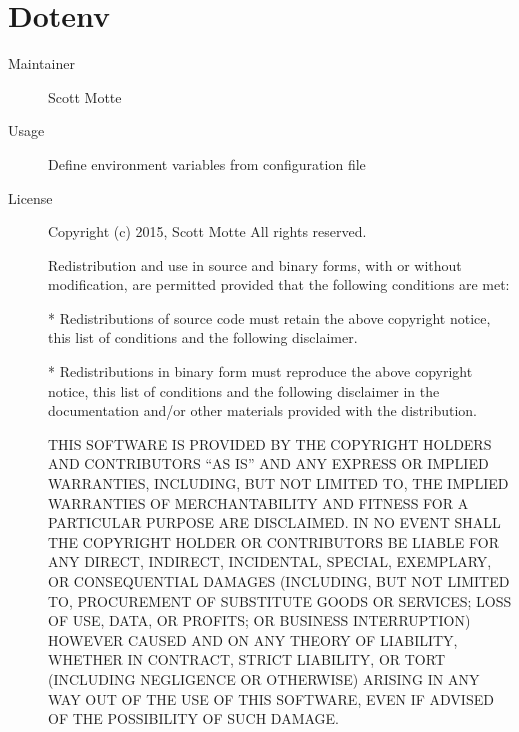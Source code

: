   \section*{Dotenv}
    \begin{description}
      \item[Maintainer] Scott Motte
      \item[Usage] Define environment variables from configuration file
      \item[License] \scriptsize Copyright (c) 2015, Scott Motte
        All rights reserved.

        Redistribution and use in source and binary forms, with or without
        modification, are permitted provided that the following conditions are met:

        * Redistributions of source code must retain the above copyright notice, this
          list of conditions and the following disclaimer.

        * Redistributions in binary form must reproduce the above copyright notice,
          this list of conditions and the following disclaimer in the documentation
          and/or other materials provided with the distribution.

        THIS SOFTWARE IS PROVIDED BY THE COPYRIGHT HOLDERS AND CONTRIBUTORS ``AS IS''
        AND ANY EXPRESS OR IMPLIED WARRANTIES, INCLUDING, BUT NOT LIMITED TO, THE
        IMPLIED WARRANTIES OF MERCHANTABILITY AND FITNESS FOR A PARTICULAR PURPOSE ARE
        DISCLAIMED. IN NO EVENT SHALL THE COPYRIGHT HOLDER OR CONTRIBUTORS BE LIABLE
        FOR ANY DIRECT, INDIRECT, INCIDENTAL, SPECIAL, EXEMPLARY, OR CONSEQUENTIAL
        DAMAGES (INCLUDING, BUT NOT LIMITED TO, PROCUREMENT OF SUBSTITUTE GOODS OR
        SERVICES; LOSS OF USE, DATA, OR PROFITS; OR BUSINESS INTERRUPTION) HOWEVER
        CAUSED AND ON ANY THEORY OF LIABILITY, WHETHER IN CONTRACT, STRICT LIABILITY,
        OR TORT (INCLUDING NEGLIGENCE OR OTHERWISE) ARISING IN ANY WAY OUT OF THE USE
        OF THIS SOFTWARE, EVEN IF ADVISED OF THE POSSIBILITY OF SUCH DAMAGE.
    \end{description}

